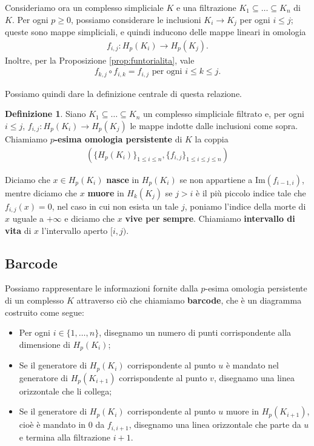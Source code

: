 \documentclass[a4paper, 12pt]{article}
\theoremstyle{definition}
\newtheorem{definition}{Definizione}[section]
\theoremstyle{remark}
\begin{document}
Consideriamo ora un complesso simpliciale $K$ e una filtrazione $K_1 \subseteq \dots \subseteq K_n$ di $K$. Per ogni $p \geq 0$, possiamo considerare le inclusioni $K_i \to K_j$ per ogni $i \leq j$; queste sono mappe simpliciali, e quindi inducono delle mappe lineari in omologia
\begin{align*}
    f_{i,j} : H_p(K_i) \to H_p(K_j).
\end{align*}
Inoltre, per la Proposizione \ref{prop:funtorialita}, vale
\begin{align*}
    f_{k,j} \circ f_{i,k} = f_{i,j} \text{ per ogni } i \leq k \leq j.
\end{align*}

Possiamo quindi dare la definizione centrale di questa relazione.

\begin{definition}
    Siano $K_1 \subseteq \dots \subseteq K_n$ un complesso simpliciale filtrato e, per ogni $i \leq j$, $f_{i,j} : H_p(K_i) \to H_p(K_j)$ le mappe indotte dalle inclusioni come sopra. Chiamiamo \textbf{$p$-esima omologia persistente} di $K$ la coppia
    \begin{align*}
        \left(\{H_p(K_i)\}_{1 \leq i \leq n}, \{f_{i,j}\}_{1 \leq i \leq j \leq n}\right)
    \end{align*}
\end{definition}

Diciamo che $x \in H_p(K_i)$ \textbf{nasce} in $H_p(K_i)$ se non appartiene a $\text{Im}(f_{i-1,i})$, mentre diciamo che $x$ \textbf{muore} in $H_k(K_j)$ se $j > i$ è il più piccolo indice tale che $f_{i,j}(x)=0$, nel caso in cui non esista un tale $j$, poniamo l'indice della morte di $x$ uguale a $+\infty$ e diciamo che $x$ \textbf{vive per sempre}. Chiamiamo \textbf{intervallo di vita} di $x$ l'intervallo aperto $[i,j)$.

\subsection{Barcode}
Possiamo rappresentare le informazioni fornite dalla $p$-esima omologia persistente di un complesso $K$ attraverso ciò che chiamiamo \textbf{barcode}, che è un diagramma costruito come segue:
\begin{itemize}
    \item Per ogni $i \in \{1, \dots, n\}$, disegnamo un numero di punti corrispondente alla dimensione di $H_p(K_i)$;
    \item Se il generatore di $H_p(K_i)$ corrispondente al punto $u$ è mandato nel generatore di $H_p(K_{i+1})$ corrispondente al punto $v$, disegnamo una linea orizzontale che li collega;
    \item Se il generatore di $H_p(K_i)$ corrispondente al punto $u$ muore in $H_p(K_{i+1})$, cioè è mandato in $0$ da $f_{i,i+1}$, disegnamo una linea orizzontale che parte da $u$ e termina alla filtrazione $i+1$.
\end{itemize}
\end{document}
